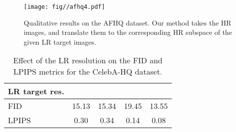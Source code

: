 \begin{figure}
\begin{center}

\texttt{[image: fig//afhq4.pdf]}
\end{center}
   \caption{Qualitative results on the AFHQ dataset. Our method takes the HR images, and translate them to the corresponding HR subspace of the given LR target images.}
\label{fig:afhq}

\end{figure}


\begin{table}[]
\centering
\begin{tabular}{lcccc}
\toprule
LR target res. &  &         &        &        \\ 
\midrule
FID        & 15.13             & 15.34    & 19.45    & 13.55    \\
LPIPS        & 0.30           & 0.34     & 0.14     & 0.08     \\ 
\bottomrule
\end{tabular}\caption{Effect of the LR resolution on the FID and LPIPS metrics for the CelebA-HQ dataset.}
\label{tab:resolution}
\vspace{-0.2cm}
\end{table}



